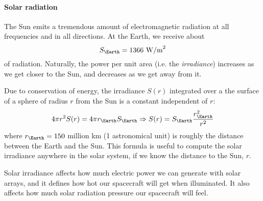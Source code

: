 \paragraph{Solar radiation}

The Sun emits a tremendous amount of electromagnetic radiation at all 
frequencies and in all directions. At the Earth, we receive about
%
\begin{equation}
S_\Earth = 1366 \mbox{ W/m}^2
\end{equation}
%
of radiation. Naturally, the power per unit area (i.e. the \emph{irradiance})
increases as we get closer to the Sun, and decreases as we get away from it.

Due to conservation of energy, the irradiance $S(r)$ integrated over a the 
surface of a sphere of radius $r$ from the Sun is a constant independent of 
$r$:
%
\begin{equation}
4\pi r^2 S(r) = 4\pi r_\Earth S_\Earth \Rightarrow 
S(r)=S_\Earth \frac{r_\Earth^2}{r^2}
\end{equation}
%
where $r_\Earth = 150$ million km (1 astronomical unit) is roughly the 
distance between the Earth and the Sun. This formula is useful to compute the 
solar irradiance anywhere in the solar system, if we know the distance to the 
Sun, $r$.

Solar irradiance affects how much electric power we can generate with solar 
arrays, and it defines how hot our spacecraft will get when illuminated.
It also affects how much solar radiation pressure our spacecraft will feel.




